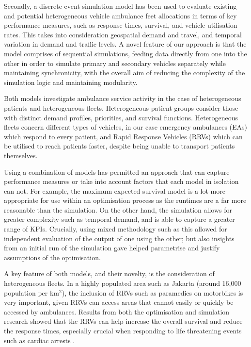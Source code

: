\documentclass[numbers,webpdf,imaman]{ima-authoring-template}%
\begin{document}
Secondly, a discrete event simulation model has been used to evaluate existing
and potential heterogeneous vehicle ambulance feet allocations in terms of key
performance measures, such as response times, survival, and vehicle utilisation
rates. This takes into consideration geospatial demand and travel, and temporal
variation in demand and traffic levels. A novel feature of our approach is that
the model comprises of sequential simulations, feeding data directly from one
into the other in order to simulate primary and secondary vehicles separately
while maintaining synchronicity, with the overall aim of reducing the complexity
of the simulation logic and maintaining modularity.

Both models investigate ambulance service activity in the case of heterogeneous
patients and heterogeneous fleets. Heterogeneous patient groups consider those
with distinct demand profiles, priorities, and survival functions. Heterogeneous
fleets concern different types of vehicles, in our case emergency ambulances
(EAs) which respond to every patient, and Rapid Response Vehicles (RRVs) which
can be utilised to reach patients faster, despite being unable to transport
patients themselves.

Using a combination of models has permitted an approach that can capture
performance measures or take into account factors that each model in isolation
can not. For example, the maximum expected survival model is a lot more
appropriate for use within an optimisation process as the runtimes are a far
more reasonable than the simulation. On the other hand, the simulation allows
for greater complexity such as temporal demand, and is able to capture a
greater range of KPIs. Crucially, using mixed methodology such as this allowed
for independent evaluation of the output of one using the other; but also
insights from an initial run of the simulation gave helped parametrise and
justify assumptions of the optimisation.

A key feature of both models, and their novelty, is the consideration of
heterogeneous fleets. In a highly populated area such as Jakarta (around
16,000 population per km$^2$), the inclusion of RRVs such as paramedics on
motorbikes is very important, given RRVs can access areas that cannot easily
or quickly be accessed by ambulances. Results from both the optimisation and
simulation research showed that the RRVs can help increase the overall
survival and reduce the response times, especially crucial when responding to
life threatening events such as cardiac arrests \citep{holmen2020shortening}.
\end{document}
